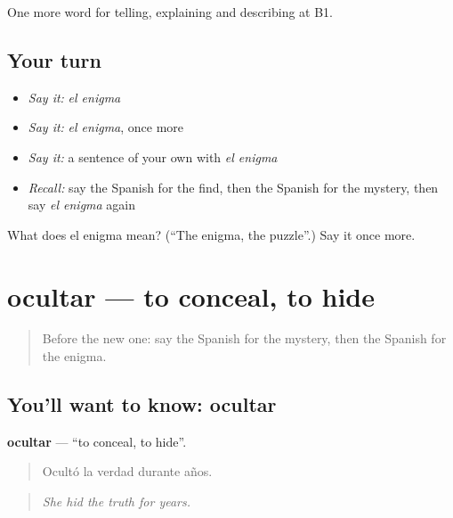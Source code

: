 \begin{grammarlens}[title={What you've built}]
One more word for telling, explaining and describing at B1.
\end{grammarlens}

\subsection*{Your turn}
\begin{itemize}
\raggedright
  \item \emph{Say it:} \emph{el enigma}
  \item \emph{Say it:} \emph{el enigma}, once more
  \item \emph{Say it:} a sentence of your own with \emph{el enigma}
  \item \emph{Recall:} say the Spanish for the find, then the Spanish for the mystery, then say \emph{el enigma} again
\end{itemize}

\begin{tcolorbox}[breakable,colback=teal!4,colframe=teal!35!black,title={Before you move on}]
What does el enigma mean? (\textquotedblleft{}The enigma, the puzzle\textquotedblright{}.) Say it once more.
\end{tcolorbox}
\section[ocultar]{ocultar — to conceal, to hide}

\label{lesson:ES-C532-ocultar}



\begin{quote}
Before the new one: say the Spanish for the mystery, then the Spanish for the enigma.
\end{quote}

\subsection*{You'll want to know: ocultar}
\textbf{ocultar} — \textquotedblleft{}to conceal, to hide\textquotedblright{}.

\begin{quote}
Ocultó la verdad durante años.
\end{quote}

\begin{quote}
\emph{She hid the truth for years.}
\end{quote}

